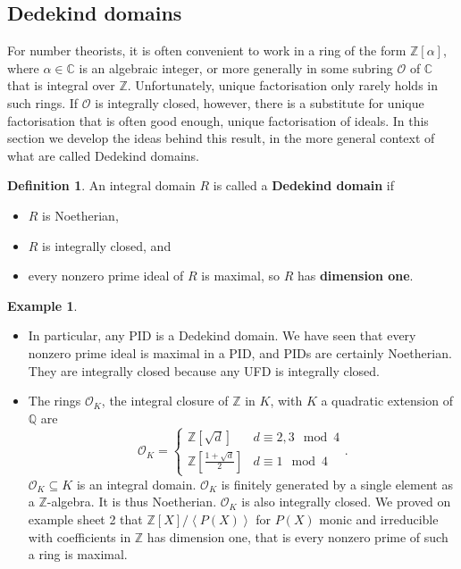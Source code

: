 \documentclass{article}
\newcommand{\Z}{\mathbb{Z}}
\newcommand{\Q}{\mathbb{Q}}
\newcommand{\C}{\mathbb{C}}
\newcommand{\rb}[1]{\left( #1 \right)}
\renewcommand{\sb}[1]{\left[ #1 \right]}
\newcommand{\ab}[1]{\left\langle #1 \right\rangle}
\theoremstyle{definition}\newtheorem{definition}{Definition}[subsection]
\theoremstyle{definition}\newtheorem{remark}[definition]{Remark}
\theoremstyle{definition}\newtheorem*{example}{Example}
\theoremstyle{definition}\newtheorem*{note}{Note}
\begin{document}
\subsection{Dedekind domains}

For number theorists, it is often convenient to work in a ring of the form $ \Z\sb{\alpha} $, where $ \alpha \in \C $ is an algebraic integer, or more generally in some subring $ \mathcal{O} $ of $ \C $ that is integral over $ \Z $. Unfortunately, unique factorisation only rarely holds in such rings. If $ \mathcal{O} $ is integrally closed, however, there is a substitute for unique factorisation that is often good enough, unique factorisation of ideals. In this section we develop the ideas behind this result, in the more general context of what are called Dedekind domains.

\begin{definition}
An integral domain $ R $ is called a \textbf{Dedekind domain} if
\begin{itemize}
\item $ R $ is Noetherian,
\item $ R $ is integrally closed, and
\item every nonzero prime ideal of $ R $ is maximal, so $ R $ has \textbf{dimension one}.
\end{itemize}
\end{definition}

\begin{example}
\hfill
\begin{itemize}
\item In particular, any PID is a Dedekind domain. We have seen that every nonzero prime ideal is maximal in a PID, and PIDs are certainly Noetherian. They are integrally closed because any UFD is integrally closed.
\item The rings $ \mathcal{O}_K $, the integral closure of $ \Z $ in $ K $, with $ K $ a quadratic extension of $ \Q $ are
$$ \mathcal{O}_K = \begin{cases}
\Z\sb{\sqrt{d}} & d \equiv 2, 3 \mod 4 \\
\Z\sb{\tfrac{1 + \sqrt{d}}{2}} & d \equiv 1 \mod 4
\end{cases}. $$
$ \mathcal{O}_K \subseteq K $ is an integral domain. $ \mathcal{O}_K $ is finitely generated by a single element as a $ \Z $-algebra. It is thus Noetherian. $ \mathcal{O}_K $ is also integrally closed. We proved on example sheet 2 that $ \Z\sb{X} / \ab{P\rb{X}} $ for $ P\rb{X} $ monic and irreducible with coefficients in $ \Z $ has dimension one, that is every nonzero prime of such a ring is maximal.
\end{itemize}
\end{example}
\end{document}
